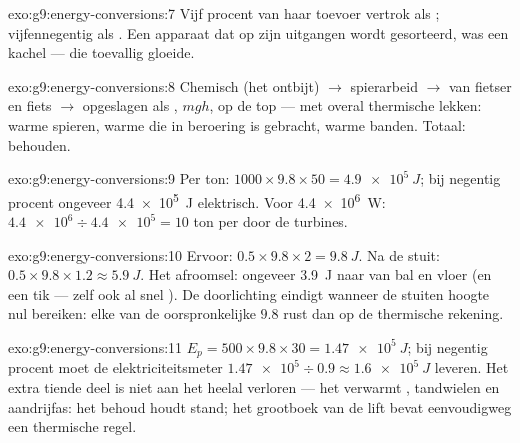 \begin{solution}{exo:g9:energy-conversions:7}
Vijf procent van haar toevoer vertrok als ;
vijfennegentig als . Een apparaat dat op zijn uitgangen wordt
gesorteerd, was een kachel --- die toevallig gloeide.
\end{solution}

\begin{solution}{exo:g9:energy-conversions:8}
Chemisch (het ontbijt) $\to$ spierarbeid $\to$
 van fietser en fiets $\to$ opgeslagen als
, $m g h$, op de top --- met overal thermische
lekken: warme spieren, warme  die in beroering is gebracht,
warme banden. Totaal: behouden.
\end{solution}

\begin{solution}{exo:g9:energy-conversions:9}
Per ton: $1000 \times 9.8 \times 50 = \qty{4.9e5}{J}$; bij negentig
procent ongeveer \qty{4.4e5}{J} elektrisch. Voor \qty{4.4e6}{W}:
$\num{4.4e6} \div \num{4.4e5} = 10$ ton per  door de turbines.
\end{solution}

\begin{solution}{exo:g9:energy-conversions:10}
Ervoor: $0.5 \times 9.8 \times 2 = \qty{9.8}{J}$. Na de stuit: $0.5
\times 9.8 \times 1.2 \approx \qty{5.9}{J}$. Het afroomsel: ongeveer
\qty{3.9}{J} naar  van bal en vloer (en een tik
 --- zelf ook al snel ). De doorlichting eindigt
wanneer de stuiten hoogte nul bereiken: elke  van de
oorspronkelijke $9.8$ rust dan op de thermische rekening.
\end{solution}

\begin{solution}{exo:g9:energy-conversions:11}
$E_p = 500 \times 9.8 \times 30 = \qty{1.47e5}{J}$; bij negentig
procent moet de elektriciteitsmeter $\num{1.47e5} \div 0.9 \approx \qty{1.6e5}{J}$
leveren. Het extra tiende deel is niet aan het heelal verloren --- het
verwarmt , tandwielen en aandrijfas: het behoud houdt stand; het
grootboek van de lift bevat eenvoudigweg een thermische regel.
\end{solution}


